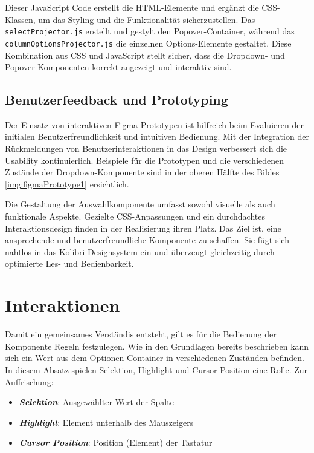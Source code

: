 Dieser JavaScript Code erstellt die HTML-Elemente und ergänzt die CSS-Klassen, um das Styling und die Funktionalität sicherzustellen. 
Das \texttt{selectProjector.js} erstellt und gestylt den Popover-Container, während das \texttt{columnOptionsProjector.js} die einzelnen Options-Elemente gestaltet.
Diese Kombination aus CSS und JavaScript stellt sicher, dass die Dropdown- und Popover-Komponenten korrekt angezeigt und interaktiv sind.


\subsection{Benutzerfeedback und Prototyping}
\label{sec:userFeedbackPtototyping}

Der Einsatz von interaktiven Figma-Prototypen ist hilfreich beim Evaluieren der initialen Benutzerfreundlichkeit und intuitiven Bedienung. 
Mit der Integration der Rückmeldungen von Benutzerinteraktionen in das Design verbessert sich die Usability kontinuierlich.
Beispiele für die Prototypen und die verschiedenen Zustände der Dropdown-Komponente sind in der oberen Hälfte des Bildes \ref{img:figmaPrototype1} ersichtlich.

Die Gestaltung der Auswahlkomponente umfasst sowohl visuelle als auch funktionale Aspekte. 
Gezielte CSS-Anpassungen und ein durchdachtes Interaktionsdesign finden in der Realisierung ihren Platz. 
Das Ziel ist, eine ansprechende und benutzerfreundliche Komponente zu schaffen. 
Sie fügt sich nahtlos in das Kolibri-Designsystem ein und überzeugt gleichzeitig durch optimierte Les- und Bedienbarkeit.


\section{Interaktionen}
\label{sec:interaction}

Damit ein gemeinsames Verständis entsteht, gilt es für die Bedienung der Komponente Regeln festzulegen.
Wie in den Grundlagen bereits beschrieben kann sich ein Wert aus dem Optionen-Container in verschiedenen Zuständen befinden.
In diesem Absatz spielen Selektion, Highlight und Cursor Position eine Rolle.
Zur Auffrischung: 

\begin{itemize}
    \item \textbf{\emph{Selektion}}: Ausgewählter Wert der Spalte
    \item \textbf{\emph{Highlight}}: Element unterhalb des Mauszeigers
    \item \textbf{\emph{Cursor Position}}: Position (Element) der Tastatur
\end{itemize}

